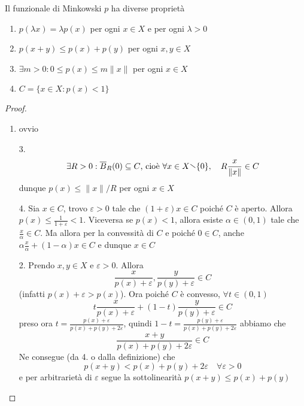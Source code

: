 \begin{lemmao} Il funzionale di Minkowski \(p\) ha diverse proprietà
\begin{enumerate}[label = \arabic*.]
    \item \(p {(\lambda x )} = \lambda p {(x)}\) per ogni \(x \in X\)  e per ogni
        \(\lambda > 0\) 
    \item \(p{(x + y)} \le p {(x)} + p {(y)}\) per ogni \(x, y \in X\) 
    \item \(\exists  m > 0 : 0 \le p {(x)} \le m \|x\|\) per ogni \(x \in X\) 
    \item \(C = \{ x \in X : p {( x)} <1\} \) 
\end{enumerate}
\end{lemmao}
\begin{proof}{}
\begin{enumerate}[label = \arabic*.]
    \item ovvio
    \item[3.] \[
          \exists R > 0 : \overline{B}_R {(0)} \subseteq C \text{, cioè } \forall x \in X \sminus \{0\}, \quad R \frac{x}{\|x\|} \in C
        \]
        dunque \(p {(x)} \le \|x\|/R\) per ogni \(x \in X\) 
    \item[4.] Sia \(x \in C\), trovo \(\varepsilon > 0\) tale che \({(1+\varepsilon)}x \in C\) poiché \(C\) è aperto. Allora \(p{(x)} \le \frac{1}{1+\varepsilon} < 1\).
        Viceversa se \(p {(x)} < 1\), allora esiste \(\alpha \in (0,1)\) tale
        che \(\frac{x}{\alpha} \in C\). Ma allora per la convessità di \(C\) e
        poiché \(0 \in C\), anche \(\alpha \frac{x}{\alpha} + {(1-\alpha)}x \in C\) e dunque \(x \in C\) 
    \item[2.] Prendo \(x,y \in X\) e \(\varepsilon > 0\). Allora
        \[
          \frac{x}{p{(x)} + \varepsilon}, \frac{y}{p{(y)} + \varepsilon} \in C
        \]
        (infatti \(p{(x)} + \varepsilon > p {(x)}\)). Ora poiché \(
        C\) è convesso, \(\forall t \in (0, 1)\) 
        \[
          t \frac{x}{p{(x)} + \varepsilon} + {(1-t)} \frac{y}{p{(y)} +\varepsilon } \in C
        \]
        preso ora \(t = \frac{p{(x)} + \varepsilon}{p {(x)} + p {(y)} + 2\varepsilon}\), quindi \(
        1-t = \frac{p {(y)} + \varepsilon}{p {(x)} + p {(y)} + 2\varepsilon}\)
        abbiamo che
        \[
            \frac{x + y}{p {(x)} + p {(y)} + 2\varepsilon} \in C
        \]
        Ne consegue (da 4. o dalla definizione) che
        \[
          p {( x + y)} < p {(x)} + p {(y)} + 2\varepsilon \quad \forall \varepsilon > 0
        \]
        e per arbitrarietà di \(\varepsilon\) segue la sottolinearità
        \(
          p {(x+y)} \le p {(x)} + p {(y)}
        \)
        
\end{enumerate}
\end{proof}
